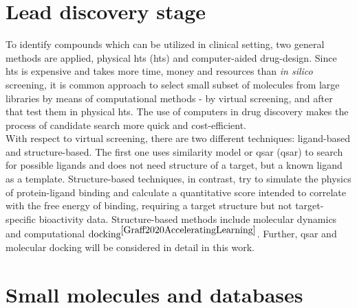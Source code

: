 \section{Lead discovery stage}\label{lead_disc}

To identify compounds which can be utilized in clinical setting, two general methods are applied, physical \acrlong{hts} (\acrshort{hts}) and computer-aided drug-design.
Since \acrshort{hts} is expensive and takes more time, money and resources than \textit{in silico }screening, it is common approach to select small subset of molecules from large libraries by means of computational methods - by virtual screening, and after that test them in physical \acrshort{hts}.
The use of computers in drug discovery makes the process of candidate search more quick and cost-efficient.\\

With respect to virtual screening, there are two different techniques: ligand-based and structure-based.
The first one uses similarity model or \acrlong{qsar} (\acrshort{qsar}) to search for possible ligands and does not need structure of a target, but a known ligand as a template.
Structure-based techniques, in contrast, try to simulate the physics of protein-ligand binding and calculate a quantitative score intended to correlate with the free energy of binding, requiring a target structure but not target-specific bioactivity data.
Structure-based methods include molecular dynamics and computational $\text{docking}^{\cite{Graff2020AcceleratingLearning}}$. Further, \acrshort{qsar} and molecular docking will be considered in detail in this work.\\

\section{Small molecules and databases}

